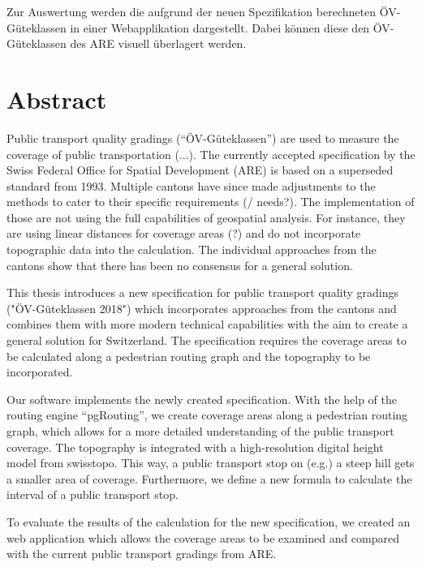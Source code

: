 Zur Auswertung werden die aufgrund der neuen Spezifikation berechneten ÖV-Güteklassen in einer Webapplikation dargestellt.
Dabei können diese den ÖV-Güteklassen des ARE visuell überlagert werden.


\cleardoublepage

\chapter*{Abstract}

Public transport quality gradings ("`ÖV-Güteklassen"') are used to measure the coverage of public transportation (...).
The currently accepted specification by the Swiss Federal Office for Spatial Development (ARE) is based on a superseded standard from 1993.
Multiple cantons have since made adjustments to the methods to cater to their specific requirements (/ needs?).
The implementation of those are not using the full capabilities of geospatial analysis.
For instance, they are using linear distances for coverage areas (?) and do not incorporate topographic data into the calculation.
The individual approaches from the cantons show that there has been no consensus for a general solution.

This thesis introduces a new specification for public transport quality gradings ("ÖV-Güteklassen 2018") which incorporates approaches from the cantons and combines them with more modern technical capabilities with the aim to create a general solution for Switzerland.
The specification requires the coverage areas to be calculated along a pedestrian routing graph and the topography to be incorporated.

Our software implements the newly created specification.
With the help of the routing engine "`pgRouting"', we create coverage areas along a pedestrian routing graph, which allows for a more detailed understanding of the public transport coverage.
The topography is integrated with a high-resolution digital height model from swisstopo.
This way, a public transport stop on (e.g.) a steep hill gets a smaller area of coverage.
Furthermore, we define a new formula to calculate the interval of a public transport stop.

To evaluate the results of the calculation for the new specification, we created an web application which allows the coverage areas to be examined and compared with the current public transport gradings from ARE.